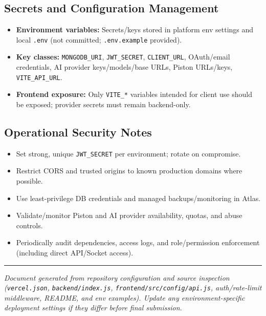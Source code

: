 ﻿\documentclass[11pt,a4paper]{article}
\begin{document}
\subsection{Secrets and Configuration Management}
\begin{itemize}[leftmargin=*]
  \item \textbf{Environment variables:} Secrets/keys stored in platform env settings and local \texttt{.env} (not committed; \texttt{.env.example} provided).
  \item \textbf{Key classes:} \texttt{MONGODB\_URI}, \texttt{JWT\_SECRET}, \texttt{CLIENT\_URL}, OAuth/email credentials, AI provider keys/models/base URLs, Piston URLs/keys, \texttt{VITE\_API\_URL}.
  \item \textbf{Frontend exposure:} Only \texttt{VITE\_*} variables intended for client use should be exposed; provider secrets must remain backend-only.
\end{itemize}

\subsection{Operational Security Notes}
\begin{itemize}[leftmargin=*]
  \item Set strong, unique \texttt{JWT\_SECRET} per environment; rotate on compromise.
  \item Restrict CORS and trusted origins to known production domains where possible.
  \item Use least-privilege DB credentials and managed backups/monitoring in Atlas.
  \item Validate/monitor Piston and AI provider availability, quotas, and abuse controls.
  \item Periodically audit dependencies, access logs, and role/permission enforcement (including direct API/Socket access).
\end{itemize}

\vspace{1em}
\hrule
\vspace{0.6em}
\noindent\textit{Document generated from repository configuration and source inspection (\texttt{vercel.json}, \texttt{backend/index.js}, \texttt{frontend/src/config/api.js}, auth/rate-limit middleware, README, and env examples). Update any environment-specific deployment settings if they differ before final submission.}
\end{document}
